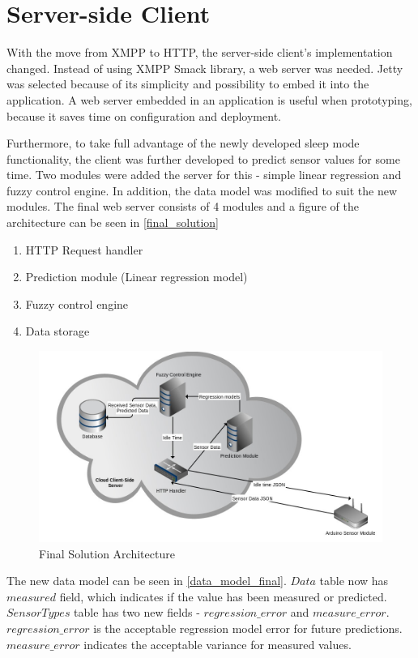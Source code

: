 \section{Server-side Client}

With the move from XMPP to HTTP, the server-side client's implementation changed. Instead of using XMPP Smack library, a web server was needed. Jetty was selected because of its simplicity and possibility to embed it into the application. A web server embedded in an application is useful when prototyping, because it saves time on configuration and deployment. 

Furthermore, to take full advantage of the newly developed sleep mode functionality, the client was further developed to predict sensor values for some time. Two modules were added the server for this - simple linear regression and fuzzy control engine. In addition, the data model was modified to suit the new modules. The final web server consists of 4 modules and a figure of the architecture can be seen in \autoref{final_solution}

\begin{enumerate}
\item HTTP Request handler
\item Prediction module (Linear regression model)
\item Fuzzy control engine
\item Data storage
\end{enumerate}

\begin{figure}[h!]
\centering
\includegraphics[scale=0.45]{4/figures/finalsolution.jpg}
\caption{Final Solution Architecture}
\label{final_solution}
\end{figure}

The new data model can be seen in \autoref{data_model_final}. $Data$ table now has $measured$ field, which indicates if the value has been measured or predicted. $SensorTypes$ table has two new fields - $regression\_error$ and $measure\_error$. $regression\_error$ is the acceptable regression model error for future predictions. $measure\_error$ indicates the acceptable variance for measured values. 

